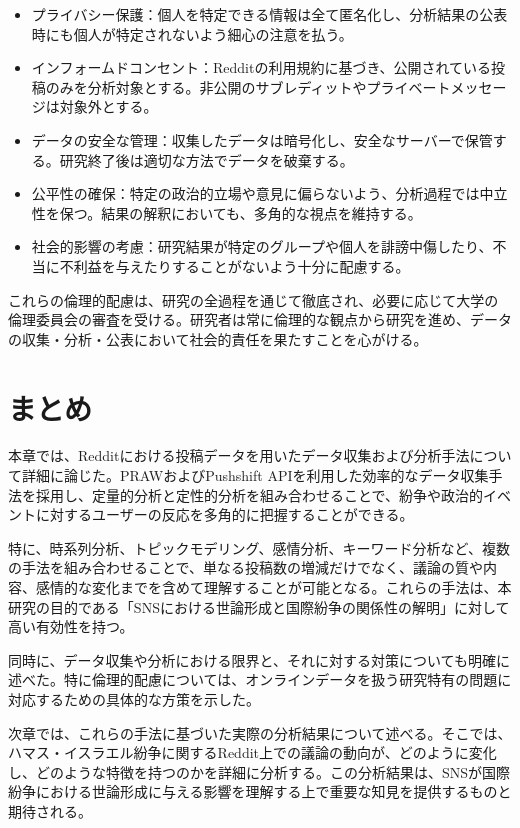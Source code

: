 \documentclass[11pt, a4j]{jreport}
\begin{document}
    \begin{itemize}
        \item プライバシー保護：個人を特定できる情報は全て匿名化し、分析結果の公表時にも個人が特定されないよう細心の注意を払う。

        \item インフォームドコンセント：Redditの利用規約に基づき、公開されている投稿のみを分析対象とする。非公開のサブレディットやプライベートメッセージは対象外とする。

        \item データの安全な管理：収集したデータは暗号化し、安全なサーバーで保管する。研究終了後は適切な方法でデータを破棄する。

        \item 公平性の確保：特定の政治的立場や意見に偏らないよう、分析過程では中立性を保つ。結果の解釈においても、多角的な視点を維持する。

        \item 社会的影響の考慮：研究結果が特定のグループや個人を誹謗中傷したり、不当に不利益を与えたりすることがないよう十分に配慮する。
    \end{itemize}

    これらの倫理的配慮は、研究の全過程を通じて徹底され、必要に応じて大学の倫理委員会の審査を受ける。研究者は常に倫理的な観点から研究を進め、データの収集・分析・公表において社会的責任を果たすことを心がける。

    \section{まとめ}
    本章では、Redditにおける投稿データを用いたデータ収集および分析手法について詳細に論じた。PRAWおよびPushshift
    APIを利用した効率的なデータ収集手法を採用し、定量的分析と定性的分析を組み合わせることで、紛争や政治的イベントに対するユーザーの反応を多角的に把握することができる。

    特に、時系列分析、トピックモデリング、感情分析、キーワード分析など、複数の手法を組み合わせることで、単なる投稿数の増減だけでなく、議論の質や内容、感情的な変化までを含めて理解することが可能となる。これらの手法は、本研究の目的である「SNSにおける世論形成と国際紛争の関係性の解明」に対して高い有効性を持つ。

    同時に、データ収集や分析における限界と、それに対する対策についても明確に述べた。特に倫理的配慮については、オンラインデータを扱う研究特有の問題に対応するための具体的な方策を示した。

    次章では、これらの手法に基づいた実際の分析結果について述べる。そこでは、ハマス・イスラエル紛争に関するReddit上での議論の動向が、どのように変化し、どのような特徴を持つのかを詳細に分析する。この分析結果は、SNSが国際紛争における世論形成に与える影響を理解する上で重要な知見を提供するものと期待される。
\end{document}
